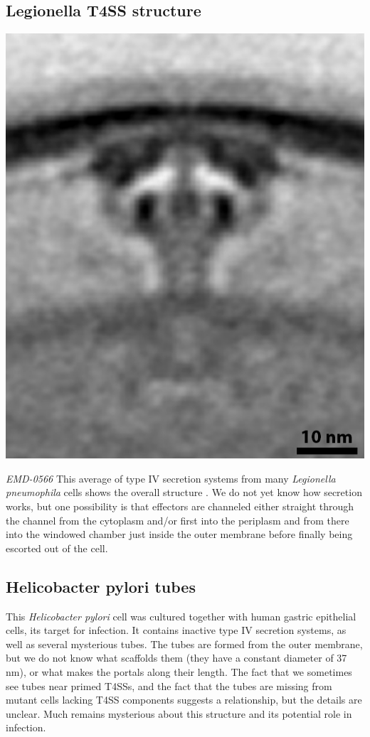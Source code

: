 \documentclass[]{tufte-book}
\begin{document}
\subsection{Legionella T4SS structure}\label{Legionella_T4SS_structure}

\includegraphics{img/schematics/9_3_2}

\emph{EMD-0566} This average of type IV secretion systems from many
\emph{Legionella pneumophila} cells shows the overall structure
\citep{ghosal2019a}. We do not yet know how secretion works, but one
possibility is that effectors are channeled either straight through the
channel from the cytoplasm and/or first into the periplasm and from
there into the windowed chamber just inside the outer membrane before
finally being escorted out of the cell.

\hypertarget{Helicobacter_pylori_tubes}{\subsection{Helicobacter pylori
tubes}\label{Helicobacter_pylori_tubes}}

This \emph{Helicobacter pylori} cell was cultured together with human
gastric epithelial cells, its target for infection. It contains inactive
type IV secretion systems, as well as several mysterious tubes. The
tubes are formed from the outer membrane, but we do not know what
scaffolds them (they have a constant diameter of 37 nm), or what makes
the portals along their length. The fact that we sometimes see tubes
near primed T4SSs, and the fact that the tubes are missing from mutant
cells lacking T4SS components suggests a relationship, but the details
are unclear. Much remains mysterious about this structure and its
potential role in infection.
\end{document}

